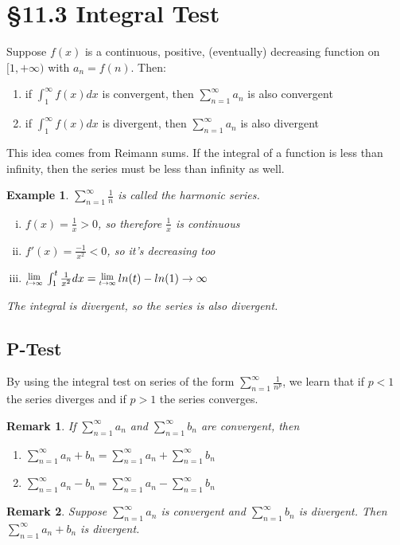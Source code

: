 \documentclass[12 pt]{article}
\newcommand{\Lim}[1]{\raisebox{0.5ex}{\scalebox{0.8}{$\displaystyle \lim_{#1}\;$}}}
\newcommand{\sumo}{\sum\limits_{n=1}^{\infty}}
\newcommand{\toinfty}{\rightarrow\infty}
\newtheorem*{exmp*}{Example}
\newtheorem*{remark}{Remark}
\begin{document}
	\section{\S 11.3 Integral Test}
		Suppose $f(x)$ is a continuous, positive, (eventually) decreasing function on $[1,+\infty)$ with $a_n=f(n)$. Then:
		\begin{enumerate}[i]
			\item if $\int_{1}^{\infty}f(x)dx$ is convergent, then $\sumo a_n$ is also convergent
			\item if $\int_{1}^{\infty}f(x)dx$ is divergent, then $\sumo a_n$ is also divergent
		\end{enumerate}
		This idea comes from Reimann sums. If the integral of a function is less than infinity, then the series must be less than infinity as well.
		\begin{exmp*}
			$\sumo \frac{1}{n}$ is called the harmonic series.\\
			\begin{enumerate}[i)]
				\item $f(x)=\frac{1}{x}>0$, so therefore $\frac{1}{x}$ is continuous
				\item $f'(x)=\frac{-1}{x^2}<0$, so it's decreasing too
				\item $\Lim{t\toinfty}\int_1^t\frac{1}{x^2}dx=\Lim{t\toinfty}ln(t)-ln(1)\rightarrow\infty$
			\end{enumerate}
			The integral is divergent, so the series is also divergent.
		\end{exmp*}

		\subsection{P-Test}

		By using the integral test on series of the form $\sumo \frac{1}{n^p}$, we learn that if $p<1$ the series diverges and if $p>1$ the series converges.
		\begin{remark}
			If $\sumo a_n$ and $\sumo b_n$ are convergent, then
			\begin{enumerate}[i]
				\item $\sumo a_n+b_n=\sumo a_n+\sumo b_n$
				\item $\sumo a_n-b_n=\sumo a_n-\sumo b_n$
			\end{enumerate}
		\end{remark}
		\begin{remark}
			Suppose $\sumo a_n$ is convergent and $\sumo b_n$ is divergent. Then $\sumo a_n+b_n$ is divergent.
		\end{remark}
\end{document}
